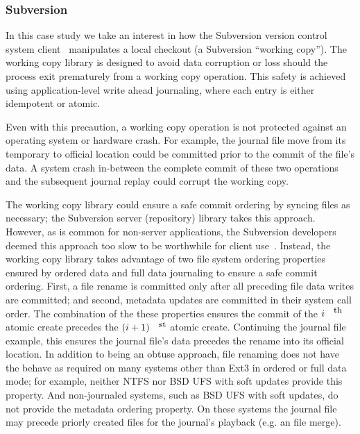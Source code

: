 \subsubsection{Subversion}
\label{sec:opgroup:svn}

In this case study we take an interest in how the Subversion version
control system client~\cite{svn} manipulates a local checkout (a
Subversion ``working copy'').
%
The working copy library is designed to avoid data corruption or loss
should the process exit prematurely from a working copy operation.
%
This safety is achieved using application-level write ahead
journaling, where each entry is either idempotent or atomic.

Even with this precaution, a working copy operation is not protected
against an operating system or hardware crash.
%
For example, the journal file move from its temporary to official
location could be committed prior to the commit of the file's data.
%
A system crash in-between the complete commit of these two operations
and the subsequent journal replay could corrupt the working copy.

The working copy library could ensure a safe commit ordering by
syncing files as necessary; the Subversion server (repository) library
takes this approach.
%
However, as is common for non-server applications, the Subversion
developers deemed this approach too slow to be worthwhile for client
use~\cite{svntradeoff}.
%
Instead, the working copy library takes advantage of two file system
ordering properties ensured by ordered data and full data journaling
to ensure a safe commit ordering.
%
First, a file rename is committed only after all preceding file data
writes are committed;
%
and second, metadata updates are committed in their system call order.
%
The combination of the these properties ensures the commit of the
$i^{\mbox{\small{th}}}$ atomic create precedes the
$(i+1)^{\mbox{\small{st}}}$ atomic create. Continuing the journal file
example, this ensures the journal file's data precedes the rename into
its official location.
%
In addition to being an obtuse approach, file renaming does not have
the behave as required on many systems other than Ext3 in ordered or
full data mode; for example, neither NTFS nor BSD UFS with soft
updates provide this property.
%
And non-journaled systems, such as BSD UFS with soft updates, do not
provide the metadata ordering property. On these systems the journal
file may precede priorly created files for the journal's playback
(e.g. an file merge).

